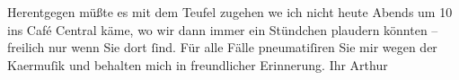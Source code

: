 \pstart
           Herentgegen müßte es mit dem Teufel zugehen {\pb}we{\geminationn} ich nicht heute Abends um 10 ins Café Central käme, wo wir dann immer ein Stündchen
               plaudern könnten – freilich nur wenn Sie dort{ }ſind. Für alle Fälle pneumatiſiren Sie
               mir wegen der Ka{\geminationm}ermuſik und behalten mich in
               freundlicher Erinnerung.\pend
           \pstart Ihr \spacefill\mbox{Arthur}\pend{}\endnumbering{}  \newcommand{\dateiname}{L00294}\newcommand{\titel}{Arthur Schnitzler an Hugo von Hofmannsthal, [18. 1. 1894]}\newcommand{\editorInnen}{Martin Anton Müller und Gerd-Hermann Susen}
